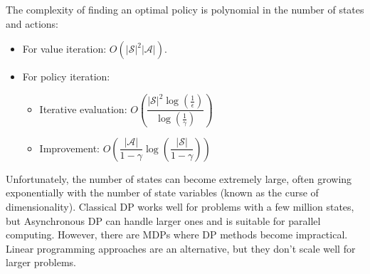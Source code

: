 The complexity of finding an optimal policy is polynomial in the number of states and actions:
\begin{itemize}
    \item For value iteration: $O(\left\lvert \mathcal{S}\right\rvert^2\left\lvert \mathcal{A}\right\rvert )$. 
    \item For policy iteration: 
        \begin{itemize}
            \item Iterative evaluation: $O\left(\dfrac{\left\lvert \mathcal{S}\right\rvert^2\log\left(\frac{1}{\epsilon}\right)}{\log\left(\frac{1}{\gamma}\right)}\right)$
            \item Improvement: $O\left(\dfrac{\left\lvert \mathcal{A}\right\rvert}{1-\gamma}\log\left(\dfrac{\left\lvert \mathcal{S}\right\rvert}{1-\gamma}\right)\right)$
        \end{itemize}
\end{itemize}
Unfortunately, the number of states can become extremely large, often growing exponentially with the number of state variables (known as the curse of dimensionality). 
Classical DP works well for problems with a few million states, but Asynchronous DP can handle larger ones and is suitable for parallel computing. 
However, there are MDPs where DP methods become impractical. 
Linear programming approaches are an alternative, but they don't scale well for larger problems.